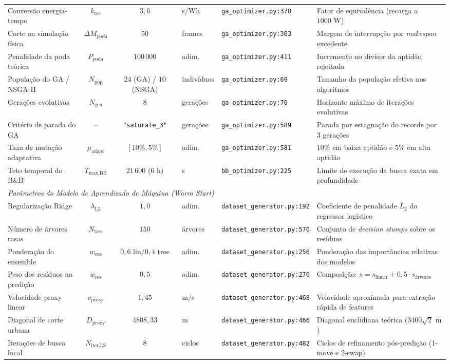 \begin{table}[htbp]
\begin{tabular}{p{3.2cm}ccp{1.2cm}p{3.2cm}p{3.8cm}}
Conversão energia-tempo & $k_{\text{rec}}$ & $3{,}6$ & s/Wh & \texttt{ga\_optimizer.py:378} & Fator de equivalência (recarga a $1000\text{ W}$) \\
Corte na simulação física & $\Delta M_{\text{poda}}$ & $50$ & frames & \texttt{ga\_optimizer.py:303} & Margem de interrupção por \textit{makespan} excedente \\
Penalidade da poda teórica & $P_{\text{poda}}$ & $100\,000$ & adim. & \texttt{ga\_optimizer.py:411} & Incremento no divisor da aptidão rejeitada \\
População do GA / NSGA-II & $N_{\text{pop}}$ & $24$ (GA) / $10$ (NSGA) & indivíduos & \texttt{ga\_optimizer.py:69} & Tamanho da população efetiva nos algoritmos \\
Gerações evolutivas & $N_{\text{gen}}$ & $8$ & gerações & \texttt{ga\_optimizer.py:70} & Horizonte máximo de iterações evolutivas \\
Critério de parada do GA & -- & \texttt{"saturate\_3"} & gerações & \texttt{ga\_optimizer.py:589} & Parada por estagnação do recorde por 3 gerações \\
Taxa de mutação adaptativa & $\mu_{\text{adapt}}$ & $[10\%, 5\%]$ & adim. & \texttt{ga\_optimizer.py:581} & $10\%$ em baixa aptidão e $5\%$ em alta aptidão \\
Teto temporal do B\&B & $T_{\text{max,BB}}$ & $21\,600$ ($6\text{ h}$) & s & \texttt{bb_optimizer.py:225} & Limite de execução da busca exata em profundidade \\
\midrule
\multicolumn{6}{l}{\textit{Parâmetros do Modelo de Aprendizado de Máquina (Warm Start)}} \\
Regularização Ridge & $\lambda_{\text{L2}}$ & $1{,}0$ & adim. & \texttt{dataset\_generator.py:192} & Coeficiente de penalidade $L_2$ do regressor logístico \\
Número de árvores rasas & $N_{\text{tree}}$ & $150$ & árvores & \texttt{dataset\_generator.py:570} & Conjunto de \textit{decision stumps} sobre os resíduos \\
Ponderação do ensemble & $w_{\text{ens}}$ & $0{,}6\text{ lin} / 0{,}4\text{ tree}$ & adim. & \texttt{dataset\_generator.py:256} & Ponderação das importâncias relativas dos modelos \\
Peso dos resíduos na predição & $w_{\text{res}}$ & $0{,}5$ & adim. & \texttt{dataset\_generator.py:270} & Composição: $s = s_{\text{linear}} + 0{,}5 \cdot s_{\text{árvores}}$ \\
Velocidade proxy linear & $v_{\text{proxy}}$ & $1{,}45$ & m/s & \texttt{dataset\_generator.py:468} & Velocidade aproximada para extração rápida de features \\
Diagonal de corte urbana & $D_{\text{proxy}}$ & $4808{,}33$ & m & \texttt{dataset\_generator.py:466} & Diagonal euclidiana teórica ($3400\sqrt{2}\text{ m}$) \\
Iterações de busca local & $N_{\text{iter,LS}}$ & $8$ & ciclos & \texttt{dataset\_generator.py:482} & Ciclos de refinamento pós-predição (1-move e 2-swap) \\
\bottomrule
\end{tabular}
\end{table}

